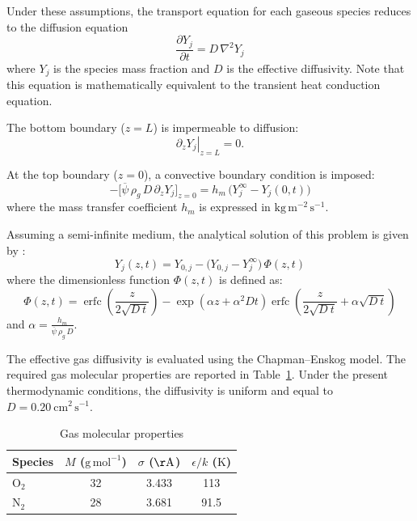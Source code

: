 \documentclass[12pt]{article}
\begin{document}
Under these assumptions, the transport equation for each gaseous species reduces to the diffusion equation
\begin{equation}
\frac{\partial Y_j}{\partial t} = D\,\nabla^2 Y_j
\end{equation}
where $Y_j$ is the species mass fraction and $D$ is the effective diffusivity. Note that this equation is mathematically equivalent to the transient heat conduction equation.

The bottom boundary ($z=L$) is impermeable to diffusion:
\begin{equation}
\left. \partial_z Y_j \right|_{z=L} = 0.
\end{equation}

At the top boundary ($z=0$), a convective boundary condition is imposed:
\begin{equation}
-\bigl[\overline{\psi}\,\rho_g\,D\,\partial_z Y_j\bigr]_{z=0} = h_m\,\bigl(Y_j^{\infty} - Y_j(0,t)\bigr)
\end{equation}
where the mass transfer coefficient $h_m$ is expressed in $\mathrm{kg\, m^{-2}\, s^{-1}}$.

Assuming a semi-infinite medium, the analytical solution of this problem is given by \cite{incropera_fundamentals_2007}:
\begin{equation}
Y_j(z,t) = Y_{0,j} - \bigl(Y_{0,j} - Y_j^{\infty}\bigr)\,\Phi(z,t)
\end{equation}
where the dimensionless function $\Phi(z,t)$ is defined as:
\begin{equation}
\Phi(z,t) = \operatorname{erfc}\!\left(\frac{z}{2\sqrt{D~t}}\right)
- \exp\!\left(\alpha z + \alpha^2 D t\right)
\operatorname{erfc}\!\left(\frac{z}{2\sqrt{D~t}} + \alpha\sqrt{D~t}\right)
\end{equation}
and $\alpha = \frac{h_m}{\overline{\psi}\,\rho_g\,D}$. 



The effective gas diffusivity is evaluated using the Chapman--Enskog model. The required gas molecular properties are reported in Table~\ref{tab:properties_diffusivity_gas}. Under the present thermodynamic conditions, the diffusivity is uniform and equal to $D = 0.20~\mathrm{cm^2\, s^{-1}}$.

\begin{table}[H]
\centering
\caption{Gas molecular properties}
\label{tab:properties_diffusivity_gas}
\begin{tabular}{@{}lccc@{}}
\toprule
Species & $M$ ($\mathrm{g\,mol^{-1}}$) & $\sigma$ ($\mathrm{\AA}$) & $\epsilon/k$ ($\mathrm{K}$) \\
\midrule
O$_2$ & 32 & 3.433 & 113 \\
N$_2$ & 28 & 3.681 & 91.5 \\
\bottomrule
\end{tabular}
\end{table}
\end{document}
